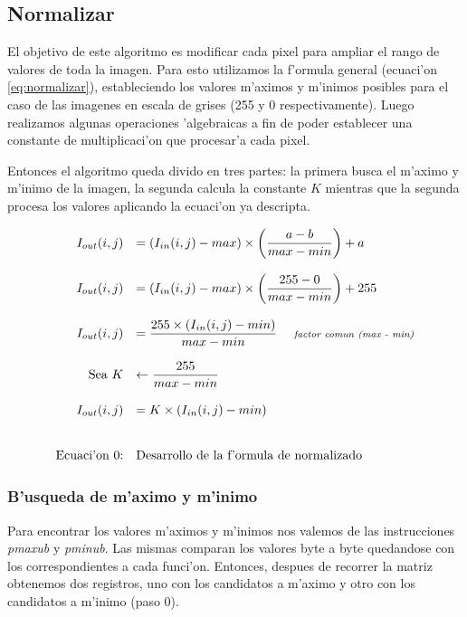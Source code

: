 \subsection{Normalizar}
El objetivo de este algoritmo es  modificar cada pixel para ampliar el rango de valores de toda la imagen. Para esto utilizamos la f'ormula general (ecuaci'on \ref{eq:normalizar}), estableciendo los valores m'aximos y m'inimos posibles para el caso de las imagenes en escala de grises (255 y 0 respectivamente). Luego realizamos algunas operaciones 'algebraicas a fin de poder establecer una constante de multiplicaci'on que procesar'a cada pixel.

Entonces el algoritmo queda divido en tres partes: la primera busca el m'aximo y m'inimo de la imagen, la segunda calcula la constante $K$ mientras que la segunda procesa los valores aplicando la ecuaci'on ya descripta.

\begin{equation}
\begin{array}{rl}
I_{out}(i,j) &= (I_{in}(i,j) - max) \times \left( \dfrac{a-b}{max-min} \right) + a  \\
\\
I_{out}(i,j) &= (I_{in}(i,j) - max) \times \left( \dfrac{255-0}{max-min} \right) + 255  \\
\\
I_{out}(i,j) &= \dfrac{255 \times (I_{in}(i,j) - min)}{max-min}  $\hspace{10pt} \textit{\scriptsize factor comun (max - min)}$ \\
\\
$Sea $ K &\leftarrow \dfrac{255}{max-min}  \\
\\
I_{out}(i,j) &= K \times (I_{in}(i,j) - min) \\
\\ \\
$Ecuaci'on \theequation:$&$Desarrollo de la f'ormula de normalizado$
\end{array} 
\label{eq:normalizar}
\end{equation}


\subsubsection*{B'usqueda de m'aximo y m'inimo}

Para encontrar los valores m'aximos y m'inimos nos valemos de las instrucciones \textit{pmaxub} y \textit{pminub}. Las mismas comparan los valores byte a byte quedandose con los correspondientes a cada funci'on. Entonces, despues de recorrer la matriz obtenemos dos registros, uno con los candidatos a m'aximo y otro con los candidatos a m'inimo (paso 0). 

